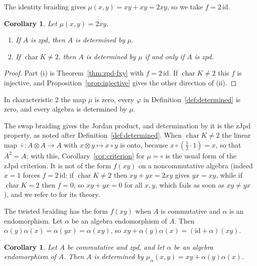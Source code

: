 \documentclass[]{interact}
\theoremstyle{plain}
\newtheorem{corollary}[theorem]{Corollary}
\theoremstyle{definition}
\theoremstyle{remark}
\begin{document}
The identity braiding gives $\mu(x,y) = xy + xy = 2xy$, so we take $f = 2\,\mathrm{id}$.

\begin{corollary}\label{cor:identity}
Let $\mu(x,y) = 2xy$.
\begin{enumerate}[label=(\roman*)]
\item If $A$ is zpd, then $A$ is determined by $\mu$.
\item If $\operatorname{char} K \neq 2$, then $A$ is determined by $\mu$ if and only if $A$ is zpd.
\end{enumerate}
\end{corollary}

\begin{proof}
Part (i) is Theorem~\ref{thm:zpd-fxy} with $f = 2\,\mathrm{id}$.
If $\operatorname{char} K \neq 2$ this $f$ is injective, and Proposition~\ref{prop:injective} gives the other direction of (ii).
\end{proof}

In characteristic $2$ the map $\mu$ is zero, every $\varphi$ in Definition~\ref{def:determined} is zero, and every algebra is determined by $\mu$.

The swap braiding gives the Jordan product, and determination by it is the zJpd property, as noted after Definition~\ref{def:determined}.
When $\operatorname{char} K \neq 2$ the linear map $\overline{\circ} \colon A \otimes A \to A$ with $x \otimes y \mapsto x \circ y$ is onto, because $x \circ (\tfrac12 \cdot 1) = x$, so that $A^2 = A$; with this, Corollary~\ref{cor:criterion} for $\mu = \circ$ is the usual form of the zJpd criterion.
It is not of the form $f(xy)$ on a noncommutative algebra (indeed $x = 1$ forces $f = 2\,\mathrm{id}$: if $\operatorname{char} K \neq 2$ then $xy + yx = 2xy$ gives $yx = xy$, while if $\operatorname{char} K = 2$ then $f = 0$, so $xy + yx = 0$ for all $x, y$, which fails as soon as $xy \neq yx$), and we refer to \citet[Section 3.3]{Bresar2021} for its theory.

The twisted braiding has the form $f(xy)$ when $A$ is commutative and $\alpha$ is an endomorphism. %
Let $\alpha$ be an algebra endomorphism of $A$.
Then $\alpha(y)\alpha(x) = \alpha(yx) = \alpha(xy)$, so $xy + \alpha(y)\alpha(x) = (\mathrm{id} + \alpha)(xy)$.

\begin{corollary}\label{cor:twisted}
Let $A$ be commutative and zpd, and let $\alpha$ be an algebra endomorphism of $A$.
Then $A$ is determined by $\mu_\alpha(x,y) = xy + \alpha(y)\alpha(x)$.
\end{corollary}
\end{document}
